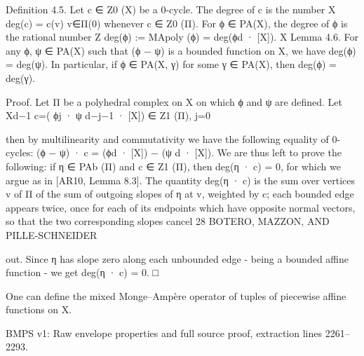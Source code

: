 \documentclass[
  11pt,
]{article}
\newenvironment{Shaded}{}{}
\newcommand{\NormalTok}[1]{#1}
\begin{document}
\begin{Shaded}
\begin{Highlighting}[]
\NormalTok{Definition 4.5. Let c ∈ Z0 (X) be a 0{-}cycle. The degree of c is the number}
\NormalTok{                                                X}
\NormalTok{                                      deg(c) =       c(v)}
\NormalTok{                                                   v∈Π(0)}
\NormalTok{whenever c ∈ Z0 (Π). For ϕ ∈ PA(X), the degree of ϕ is the rational number}
\NormalTok{                                      Z}
\NormalTok{                            deg(ϕ) :=   MApoly (ϕ) = deg(ϕd · [X]).}
\NormalTok{                                            X}
\NormalTok{Lemma 4.6. For any ϕ, ψ ∈ PA(X) such that (ϕ − ψ) is a bounded function on X, we have}
\NormalTok{deg(ϕ) = deg(ψ). In particular, if ϕ ∈ PA(X, γ) for some γ ∈ PA(X), then deg(ϕ) = deg(γ).}

\NormalTok{Proof. Let Π be a polyhedral complex on X on which ϕ and ψ are defined. Let}
\NormalTok{                                   Xd−1}
\NormalTok{                                c=(     ϕj · ψ d−j−1 · [X]) ∈ Z1 (Π),}
\NormalTok{                                      j=0}

\NormalTok{then by multilinearity and commutativity we have the following equality of 0{-}cycles:}
\NormalTok{                                (ϕ − ψ) · c = (ϕd · [X]) − (ψ d · [X]).}
\NormalTok{We are thus left to prove the following: if η ∈ PAb (Π) and c ∈ Z1 (Π), then deg(η · c) = 0, for which}
\NormalTok{we argue as in [AR10, Lemma 8.3]. The quantity deg(η · c) is the sum over vertices v of Π of the}
\NormalTok{sum of outgoing slopes of η at v, weighted by c; each bounded edge appears twice, once for each}
\NormalTok{of its endpoints which have opposite normal vectors, so that the two corresponding slopes cancel}
\NormalTok{28                                     BOTERO, MAZZON, AND PILLE{-}SCHNEIDER}


\NormalTok{out. Since η has slope zero along each unbounded edge {-} being a bounded affine function {-} we get}
\NormalTok{deg(η · c) = 0.                                                                               □}

\NormalTok{     One can define the mixed Monge–Ampère operator of tuples of piecewise affine functions on X.}
\end{Highlighting}
\end{Shaded}

BMPS v1: Raw envelope properties and full source proof, extraction lines
2261--2293.
\end{document}
